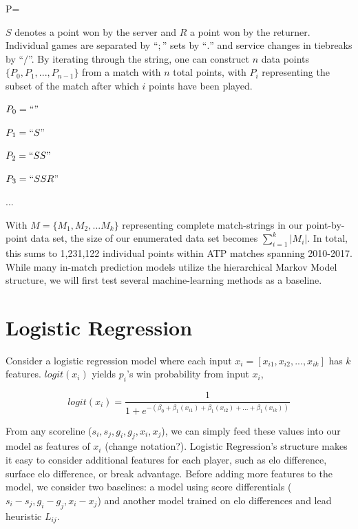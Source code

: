 \documentclass[chapterprefix=false]{report}
\begin{document}
P=

$S$ denotes a point won by the server and $R$ a point won by the returner. Individual games are separated by ``$;$'' sets by ``$.$'' and service changes in tiebreaks by ``$/$''. By iterating through the string, one can construct $n$ data points $\{P_0,P_1,...,P_{n-1}\}$ from a match with $n$ total points, with $P_i$ representing the subset of the match after which $i$ points have been played.

$P_0 = ``"$

$P_1 = ``S"$

$P_2 = ``SS"$

$P_3 = ``SSR"$

...

With $M = \{M_1,M_2,...M_k\}$ representing complete match-strings in our point-by-point data set, the size of our enumerated data set becomes $\sum_{i=1}^k |M_i|$. In total, this sums to 1,231,122 individual points within ATP matches spanning 2010-2017. While many in-match prediction models utilize the hierarchical Markov Model structure, we will first test several machine-learning methods as a baseline.


\section{Logistic Regression}

Consider a logistic regression model where each input $x_i = [x_{i1},x_{i2},...,x_{ik}]$ has $k$ features. $logit(x_i)$ yields $p_i$'s win probability from input $x_i$,

$$logit(x_i) = \frac{1}{1+e^{-(\beta_0+\beta_1(x_{i1})+\beta_1(x_{i2})+...+\beta_1(x_{ik}))}}$$

From any scoreline ($s_i,s_j,g_i,g_j,{x}_i,{x}_j$), we can simply feed these values into our model as features of $x_i$ (change notation?). Logistic Regression's structure makes it easy to consider additional features for each player, such as elo difference, surface elo difference, or break advantage. Before adding more features to the model, we consider two baselines: a model using score differentials ($s_i-s_j,g_i-g_j,{x}_i-{x}_j$) and another model trained on elo differences and lead heuristic $L_{ij}$.
\end{document}
